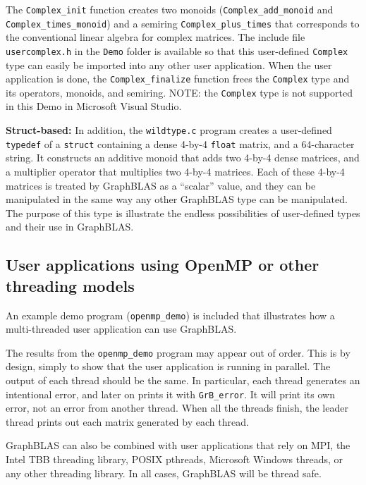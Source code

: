 \documentclass[12pt]{article}
\begin{document}
The \verb'Complex_init' function creates two monoids (\verb'Complex_add_monoid'
and \verb'Complex_times_monoid') and a semiring \verb'Complex_plus_times' that
corresponds to the conventional linear algebra for complex matrices.  The
include file \verb'usercomplex.h' in the \verb'Demo' folder is available so
that this user-defined \verb'Complex' type can easily be imported into any
other user application.  When the user application is done, the
\verb'Complex_finalize' function frees the \verb'Complex' type and its
operators, monoids, and semiring.
NOTE: the \verb'Complex' type is not supported in this Demo in Microsoft
Visual Studio.

{\bf Struct-based:}
In addition, the \verb'wildtype.c' program  creates a user-defined
\verb'typedef' of a \verb'struct' containing a dense 4-by-4 \verb'float'
matrix, and a 64-character string.  It constructs an additive monoid that adds
two 4-by-4 dense matrices, and a multiplier operator that multiplies two 4-by-4
matrices.  Each of these 4-by-4 matrices is treated by GraphBLAS as a
``scalar'' value, and they can be manipulated in the same way any other
GraphBLAS type can be manipulated. The purpose of this type is illustrate the
endless possibilities of user-defined types and their use in GraphBLAS.

\subsection{User applications using OpenMP or other threading models}
\label{threads}

An example demo program (\verb'openmp_demo') is included that illustrates how a
multi-threaded user application can use GraphBLAS.

The results from the \verb'openmp_demo' program may appear out of order.  This
is by design, simply to show that the user application is running in parallel.
The output of each thread should be the same.  In particular, each thread
generates an intentional error, and later on prints it with \verb'GrB_error'.
It will print its own error, not an error from another thread.  When all the
threads finish, the leader thread prints out each matrix generated by each
thread.

GraphBLAS can also be combined with user applications that rely on MPI, the
Intel TBB threading library, POSIX pthreads, Microsoft Windows threads, or any
other threading library.  In all cases, GraphBLAS will be thread safe.
\end{document}
